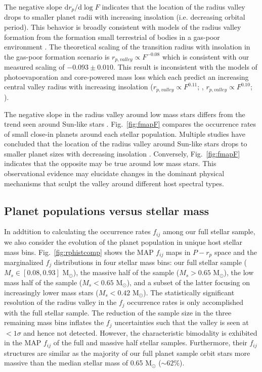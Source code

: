 \documentclass[twocolumn]{emulateapj}
\begin{document}
The negative slope $\text{d}r_p / \text{d}\log{F}$ indicates that the location of the radius valley
drops to smaller planet radii with increasing insolation (i.e. decreasing orbital period). This behavior
is broadly consistent with models of the radius valley formation from the formation small terrestrial of
bodies in a gas-poor environment \citep{lee14,lee16,lopez18}. The theoretical scaling of the transition
radius with insolation in the gas-poor formation scenario is $r_{p,valley} \propto F^{-0.08}$
\citep{lopez18} which is
consistent with our measured scaling of $-0.093\pm 0.010$. This result is inconsistent with the
models of photoevaporation and core-powered mass loss which each predict an increasing central valley
radius with increasing insolation ($r_{p,valley} \propto F^{0.11}$; \citealt{lopez18},  
$r_{p,valley} \propto F^{0.10}$; \citealt{gupta19b}).

The negative slope in the radius valley around low mass stars differs from the trend seen around
Sun-like stars \citep{fulton17}. Fig.~\ref{fig:fmapF} compares the occurrence rates of small close-in
planets around each stellar population. Multiple studies have concluded that the location of the
radius valley around Sun-like stars drops to smaller planet sizes with decreasing insolation
\citep[e.g.][]{vaneylen18,martinez19}. Conversely, Fig.~\ref{fig:fmapF} indicates that the opposite
may be true around low mass stars. This observational evidence may elucidate changes in the dominant
physical mechanisms that sculpt the valley around different host spectral types.


\subsection{Planet populations versus stellar mass} \label{sect:Msbin}
In addtition to calculating the occurrence rates $f_{ij}$ among our full stellar sample, we also consider
the evolution of the planet population in unique host stellar mass bins. Fig.~\ref{fig:rphistcomp} shows
the MAP $f_{ij}$ maps in $P-r_p$ space and the marginalized $f_j$ distributions in four stellar mass bins:
our full stellar sample
($M_s \in [0.08,0.93]$ M$_{\odot}$), the massive half of the sample ($M_s>0.65$ M$_{\odot}$),  
the low mass half of the sample ($M_s<0.65$ M$_{\odot}$), and a subset of the latter focusing on
increasingly lower mass stars ($M_s<0.42$ M$_{\odot}$). The statistically significant resolution of the
radius valley in the $f_j$ occurrence rates is only accomplished with the full stellar sample. The reduction
of the sample size in the three remaining mass bins inflates the $f_j$ uncertainties such that the valley
is seen at $<1\sigma$ and hence not detected. However, the characteristic bimodality is exhibited in the
MAP $f_{ij}$ of the full and massive half stellar samples. Furthermore, their $f_{ij}$ structures are similar
as the majority of our full planet sample orbit stars more massive than the median stellar mass of 0.65
M$_{\odot}$ ($\sim 62$\%).
\end{document}
